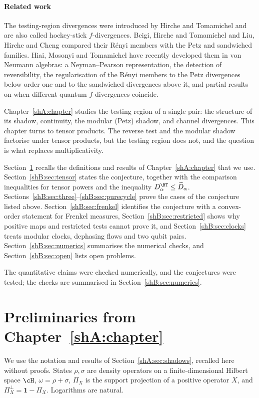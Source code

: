 \paragraph{Related work} The testing-region divergences were introduced by Hirche and Tomamichel \cite{HircheTomamichel2024} and are also called hockey-stick $f$-divergences. Beigi, Hirche and Tomamichel \cite{BeigiHircheTomamichel2025} and Liu, Hirche and Cheng \cite{LiuHircheCheng2025} compared their R\'enyi members with the Petz and sandwiched families. Hiai, Mosonyi and Tomamichel \cite{HMT2026} have recently developed them in von Neumann algebras: a Neyman--Pearson representation, the detection of reversibility, the regularisation of the R\'enyi members to the Petz divergences below order one and to the sandwiched divergences above it, and partial results on when different quantum $f$-divergences coincide.

Chapter~\ref{shA:chapter} studies the testing region of a single pair: the structure of its shadow, continuity, the modular (Petz) shadow, and channel divergences. This chapter turns to tensor products. The reverse test and the modular shadow factorise under tensor products, but the testing region does not, and the question is what replaces multiplicativity.

Section~\ref{shB:sec:prelim} recalls the definitions and results of Chapter~\ref{shA:chapter} that we use. Section~\ref{shB:sec:tensor} states the conjecture, together with the comparison inequalities for tensor powers and the inequality $D^\HT_\alpha\le\widetilde D_\alpha$. Sections~\ref{shB:sec:three}--\ref{shB:sec:purecycle} prove the cases of the conjecture listed above. Section~\ref{shB:sec:frenkel} identifies the conjecture with a convex-order statement for Frenkel measures, Section~\ref{shB:sec:restricted} shows why positive maps and restricted tests cannot prove it, and Section~\ref{shB:sec:clocks} treats modular clocks, dephasing flows and two qubit pairs. Section~\ref{shB:sec:numerics} summarises the numerical checks, and Section~\ref{shB:sec:open} lists open problems.

The quantitative claims were checked numerically, and the conjectures were tested; the checks are summarised in Section~\ref{shB:sec:numerics}.

\section{Preliminaries from Chapter~\ref{shA:chapter}}\label{shB:sec:prelim}
We use the notation and results of Section~\ref{shA:sec:shadows}, recalled here without proofs. States $\rho,\sigma$ are density operators on a finite-dimensional Hilbert space $\cH$, $\omega=\rho+\sigma$, $\Pi_X$ is the support projection of a positive operator $X$, and $\Pi_X^\perp=\mathbf 1-\Pi_X$. Logarithms are natural.

